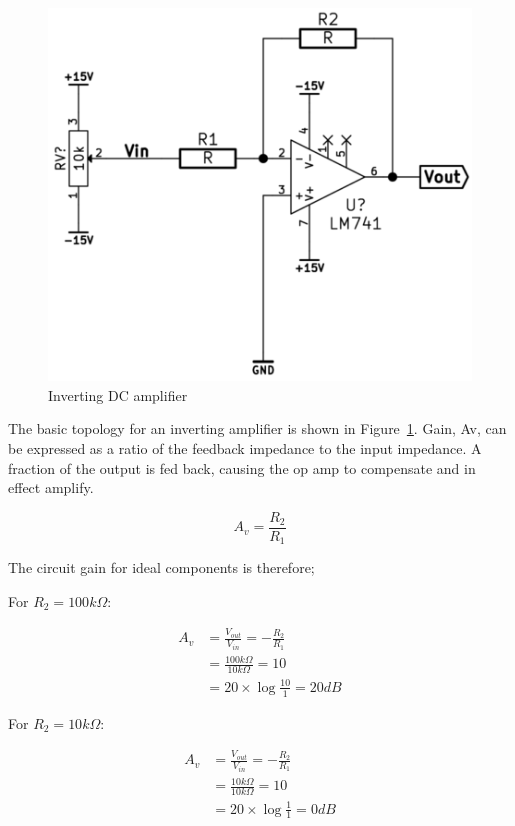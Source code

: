 \documentclass[]{article}
\begin{document}
\begin{figure}[htbp]
    \centering
        \includegraphics[scale=0.5]{img/invDCamp.png}
    \caption{Inverting DC amplifier}
    \label{fig:invDCamp}
\end{figure}

The basic topology for an inverting amplifier is shown in Figure~\ref{fig:invDCamp}.
Gain, Av, can be expressed as a ratio of the feedback impedance to the
input impedance. A fraction of the output is fed back, causing the op
amp to compensate and in effect amplify.

\begin{equation}
    A_v = \frac{R_2}{R_1}
\end{equation}

The circuit gain for ideal components is therefore;

For $R_2 = 100k\Omega$:

\begin{align} 
A_v     &= \frac{V_{out}}{V_{in}} = -\frac{R_2}{R_1}\\
        &= \frac{100k\Omega}{10k\Omega} = 10\\
        &= 20 \times \log{\frac{10}{1}} = 20dB  
\end{align}

For $R_2 = 10k\Omega$:

\begin{align} 
A_v     &= \frac{V_{out}}{V_{in}} = -\frac{R_2}{R_1}\\
        &= \frac{10k\Omega}{10k\Omega} = 10\\
        &= 20 \times \log{\frac{1}{1}} = 0dB  
\end{align}
\end{document}
